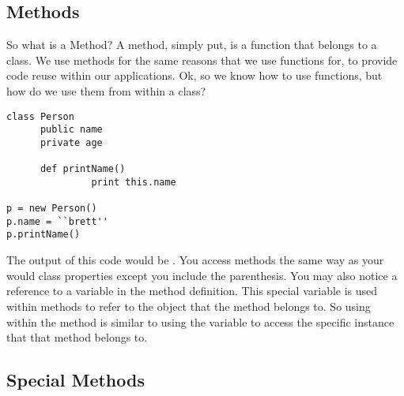 \subsection{Methods}
So what is a Method?
A method, simply put, is a function that belongs to a class.
We use methods for the same reasons that we use functions for, to provide code reuse within our applications.
Ok, so we know how to use functions, but how do we use them from within a class?
\par

\begin{lstlisting}[caption={Class Methods}]
class Person
      public name
      private age
      
      def printName()
               print this.name

p = new Person()
p.name = ``brett''
p.printName()      
\end{lstlisting}

The output of this code would be .
You access methods the same way as your would class properties except you include the parenthesis.
You may also notice a reference to a variable  in the method definition.
This special variable is used within methods to refer to the object that the method belongs to.
So using  within the method  is similar to using the variable  to access
the specific instance that that method belongs to.

\subsection{Special Methods}

